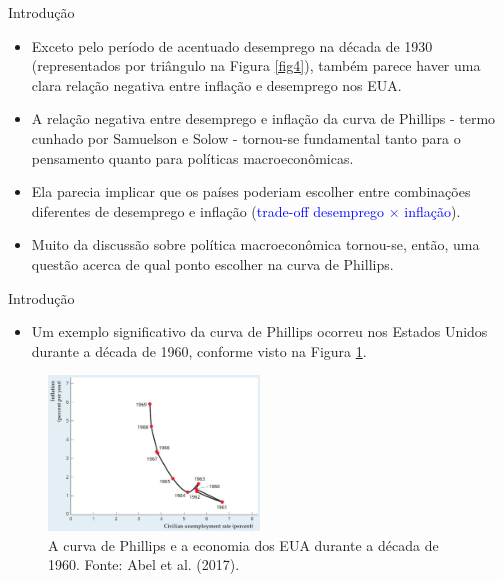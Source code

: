 \documentclass[10pt]{beamer}
\begin{document}
\begin{frame}{Introdução}
    \begin{itemize}
        \item Exceto pelo período de acentuado desemprego na década de 1930 (representados por triângulo na Figura \ref{fig4}), também parece haver uma clara relação negativa entre inflação e desemprego nos EUA.
        \bigskip
        \item A relação negativa entre desemprego e inflação da curva de Phillips - termo cunhado por Samuelson e Solow - tornou-se fundamental tanto para o pensamento quanto para políticas macroeconômicas.
        \bigskip
        \item Ela parecia implicar que os países poderiam escolher entre combinações diferentes de desemprego e inflação (\textcolor{blue}{trade-off desemprego $\times$ inflação}).
        \bigskip
        \item Muito da discussão sobre política macroeconômica tornou-se, então, uma questão acerca de qual ponto escolher na curva de Phillips.
    \end{itemize}
\end{frame}

\begin{frame}{Introdução}
    \begin{itemize}
        \item Um exemplo significativo da curva de Phillips ocorreu nos Estados Unidos durante a década de 1960, conforme visto na Figura \ref{fig5}.
    \end{itemize}
    \begin{figure}
        \centering
        \includegraphics[width=0.5\textwidth]{./figures/aula13_fig6.JPG}
        \caption{A curva de Phillips e a economia dos EUA durante a década de 1960. Fonte: Abel et al. (2017).}
        \label{fig5}
    \end{figure}
\end{frame}
\end{document}
